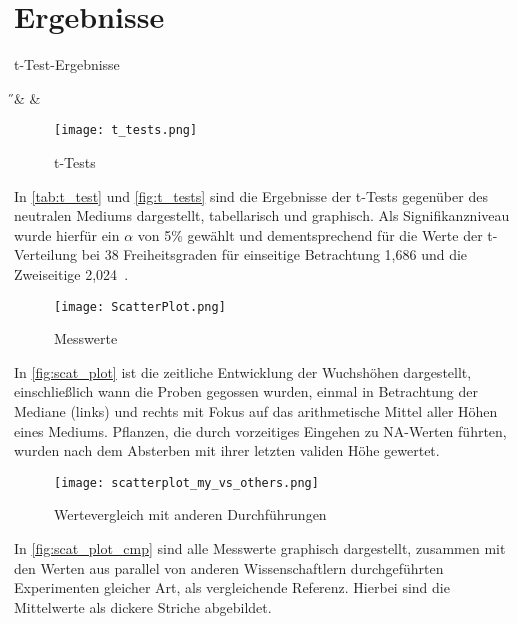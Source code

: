 \section{Ergebnisse} %
    \label{sec:ergebnisse}
    \begin{table}[h]
        \centering
        \caption{t-Test-Ergebnisse}
        \label{tab:t_test}
        {\H & \pH & \NaCl}
    \end{table}

    \begin{figure}[h]
        \texttt{[image: t\_tests.png]}
        \caption{t-Tests}
        \label{fig:t_tests}
    \end{figure}
    In \autoref{tab:t_test} und \autoref{fig:t_tests} sind die Ergebnisse der t-Tests gegenüber des neutralen Mediums dargestellt, tabellarisch und graphisch. Als Signifikanzniveau wurde hierfür ein \( \alpha \) von 5\% gewählt und dementsprechend für die Werte der t-Verteilung bei 38 Freiheitsgraden für einseitige Betrachtung 1,686 und die Zweiseitige 2,024\ \cite[vgl.][]{web:t-values}.
    \newpage

    \begin{figure}[h]
        \centering
        \texttt{[image: ScatterPlot.png]}
        \caption{Messwerte}
        \label{fig:scat_plot}
    \end{figure}
    In \autoref{fig:scat_plot} ist die zeitliche Entwicklung der Wuchshöhen dargestellt, einschließlich wann die Proben gegossen wurden, einmal in Betrachtung der Mediane (links) und rechts mit Fokus auf das arithmetische Mittel aller Höhen eines Mediums. Pflanzen, die durch vorzeitiges Eingehen zu NA-Werten führten, wurden nach dem Absterben mit ihrer letzten validen Höhe gewertet.

    \begin{figure}[h]
        \centering
        \texttt{[image: scatterplot\_my\_vs\_others.png]}
        \caption{Wertevergleich mit anderen Durchführungen}
        \label{fig:scat_plot_cmp}
    \end{figure}
    In \autoref{fig:scat_plot_cmp} sind alle Messwerte graphisch dargestellt, zusammen mit den Werten aus parallel von anderen Wissenschaftlern durchgeführten Experimenten gleicher Art, als vergleichende Referenz. Hierbei sind die Mittelwerte als dickere Striche abgebildet.
    \newpage


